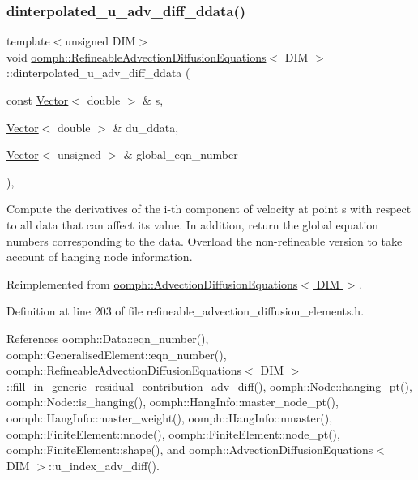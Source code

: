 \subsubsection{\texorpdfstring{dinterpolated\+\_\+u\+\_\+adv\+\_\+diff\+\_\+ddata()}{dinterpolated\_u\_adv\_diff\_ddata()}}
{\footnotesize\ttfamily template$<$unsigned D\+IM$>$ \\
void \hyperlink{classoomph_1_1RefineableAdvectionDiffusionEquations}{oomph\+::\+Refineable\+Advection\+Diffusion\+Equations}$<$ D\+IM $>$\+::dinterpolated\+\_\+u\+\_\+adv\+\_\+diff\+\_\+ddata (\begin{DoxyParamCaption}\item[{const \hyperlink{classoomph_1_1Vector}{Vector}$<$ double $>$ \&}]{s,  }\item[{\hyperlink{classoomph_1_1Vector}{Vector}$<$ double $>$ \&}]{du\+\_\+ddata,  }\item[{\hyperlink{classoomph_1_1Vector}{Vector}$<$ unsigned $>$ \&}]{global\+\_\+eqn\+\_\+number }\end{DoxyParamCaption})\hspace{0.3cm}{\ttfamily [inline]}, {\ttfamily [virtual]}}



Compute the derivatives of the i-\/th component of velocity at point s with respect to all data that can affect its value. In addition, return the global equation numbers corresponding to the data. Overload the non-\/refineable version to take account of hanging node information. 



Reimplemented from \hyperlink{classoomph_1_1AdvectionDiffusionEquations_a7b264e70255fa420e443e60cbd8d7dbc}{oomph\+::\+Advection\+Diffusion\+Equations$<$ D\+I\+M $>$}.



Definition at line 203 of file refineable\+\_\+advection\+\_\+diffusion\+\_\+elements.\+h.



References oomph\+::\+Data\+::eqn\+\_\+number(), oomph\+::\+Generalised\+Element\+::eqn\+\_\+number(), oomph\+::\+Refineable\+Advection\+Diffusion\+Equations$<$ D\+I\+M $>$\+::fill\+\_\+in\+\_\+generic\+\_\+residual\+\_\+contribution\+\_\+adv\+\_\+diff(), oomph\+::\+Node\+::hanging\+\_\+pt(), oomph\+::\+Node\+::is\+\_\+hanging(), oomph\+::\+Hang\+Info\+::master\+\_\+node\+\_\+pt(), oomph\+::\+Hang\+Info\+::master\+\_\+weight(), oomph\+::\+Hang\+Info\+::nmaster(), oomph\+::\+Finite\+Element\+::nnode(), oomph\+::\+Finite\+Element\+::node\+\_\+pt(), oomph\+::\+Finite\+Element\+::shape(), and oomph\+::\+Advection\+Diffusion\+Equations$<$ D\+I\+M $>$\+::u\+\_\+index\+\_\+adv\+\_\+diff().

